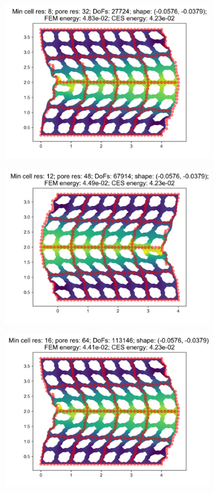 \begin{figure}[H]
\begin{subfigure}{.45\textwidth}
\end{subfigure}
\begin{subfigure}{.45\textwidth}
  \centering
  \includegraphics[width=.8\linewidth]{lces/vis_compression/bm_1_mesh_3.png}
\end{subfigure}
\newline
\begin{subfigure}{.45\textwidth}
  \centering
  \includegraphics[width=.8\linewidth]{lces/vis_compression/bm_1_mesh_4.png}
\end{subfigure}
\begin{subfigure}{.45\textwidth}
  \centering
  \includegraphics[width=.8\linewidth]{lces/vis_compression/bm_1_mesh_5.png}
\end{subfigure}
\end{figure}

